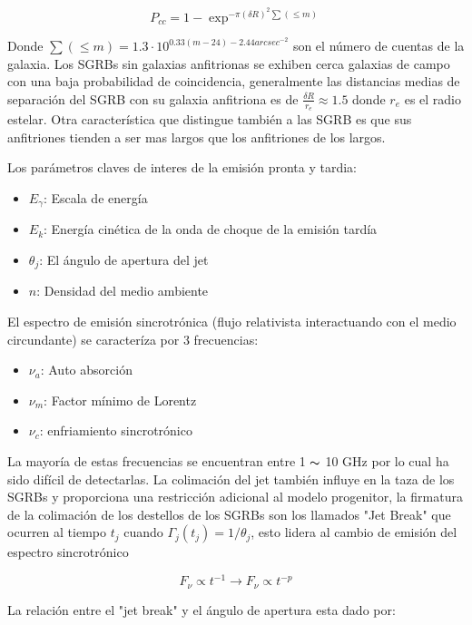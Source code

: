 \documentclass[12pt,a4paper]{book}
\begin{document}
\begin{equation}
P_{cc} = 1 - \exp ^{- \pi (\delta R)^{2} \sum(\leq m)}
\end{equation}

Donde $\sum(\leq m) = 1.3\cdot 10^{0.33(m-24)-2.44 arcsec ^{-2}}$ son el número de cuentas de la galaxia. Los SGRBs sin galaxias anfitrionas se exhiben cerca galaxias de campo con una baja probabilidad de coincidencia, generalmente las distancias medias de separación del SGRB con su galaxia anfitriona es de $ \frac{\delta R}{r_e} \approx 1.5$ donde $r_e$ es el radio estelar. Otra característica que distingue también a las SGRB es que sus anfitriones tienden a ser mas largos que los anfitriones de los largos.

Los parámetros claves de interes de la emisión pronta y tardia:
\begin{itemize}
\item $E_{\gamma}$: Escala de energía
\item $E_k$: Energía cinética de la onda de choque de la emisión tardía
\item $\theta_j$: El ángulo de apertura del jet
\item $n$: Densidad del medio ambiente
\end{itemize}

El espectro de emisión sincrotrónica (flujo relativista interactuando con el medio circundante) se caracteríza por 3 frecuencias:
\begin{itemize}
\item $\nu_a$: Auto absorción
\item $\nu_m$: Factor mínimo de Lorentz
\item $\nu_c$: enfriamiento sincrotrónico
\end{itemize}

La mayoría de estas frecuencias se encuentran entre 1 $\thicksim$ 10 GHz por lo cual ha sido difícil de detectarlas. La colimación del jet también influye en la taza de los SGRBs y proporciona una restricción adicional al modelo progenitor, la firmatura de la colimación de los destellos de los SGRBs son los llamados "Jet Break" que ocurren al tiempo $t_j$ cuando $\Gamma_j(t_j) = 1/ \theta_j$, esto lidera al cambio de emisión del espectro sincrotrónico

\begin{equation}
F_\nu \propto t^{-1} \longrightarrow F_\nu \propto t^{-p}
\end{equation}

La relación entre el "jet break" y el ángulo de apertura esta dado por:
\end{document}
